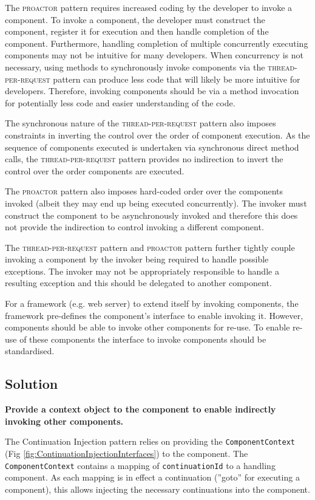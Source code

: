 \documentclass[prodmode]{style/acmlarge}
\begin{document}
The \textsc{proactor} pattern requires increased coding by the developer to
invoke a component.  To invoke a component, the developer must construct the
component, register it for execution and then handle completion of the
component.  Furthermore, handling completion of multiple concurrently executing
components may not be intuitive for many developers.  When concurrency is not
necessary, using methods to synchronously invoke components via the
\textsc{thread-per-request} pattern can produce less code that will likely be
more intuitive for developers.  Therefore, invoking components should be via a
method invocation for potentially less code and easier understanding of the
code.

The synchronous nature of the \textsc{thread-per-request} pattern also imposes
constraints in inverting the control over the order of component execution.  As
the sequence of components executed is undertaken via synchronous direct method
calls, the \textsc{thread-per-request} pattern provides no indirection to invert
the control over the order components are executed.

The \textsc{proactor} pattern also imposes hard-coded order over the components
invoked (albeit they may end up being executed concurrently).  The invoker must
construct the component to be asynchronously invoked and therefore this does not
provide the indirection to control invoking a different component.

The \textsc{thread-per-request} pattern and \textsc{proactor} pattern further
tightly couple invoking a component by the invoker being required to handle
possible exceptions.  The invoker may not be appropriately responsible to handle
a resulting exception and this should be delegated to another component.

For a framework (e.g. web server) to extend itself by invoking components, the
framework pre-defines the component's interface to enable invoking it.  However,
components should be able to invoke other components for re-use.  To enable
re-use of these components the interface to invoke components should be
standardised.


\subsection{Solution}

\textbf{Provide a context object to the component to enable indirectly invoking other components.}

The Continuation Injection pattern relies on providing the
\texttt{ComponentContext} (Fig \ref{fig:ContinuationInjectionInterfaces}) to the
component.  The \texttt{ComponentContext} contains a mapping of
\texttt{continuationId} to a handling component.  As each mapping is in effect a
continuation (''goto'' for executing a component), this allows injecting the
necessary continuations into the component.  
\end{document}
